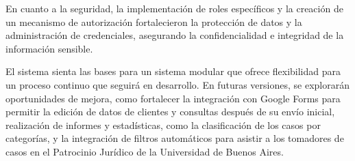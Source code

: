 En cuanto a la seguridad, la implementación de roles específicos y la creación de un mecanismo de autorización fortalecieron la protección de datos y la administración de credenciales, asegurando la confidencialidad e integridad de la información sensible.

El sistema sienta las bases para un sistema modular que ofrece flexibilidad para un proceso continuo que seguirá en desarrollo. En futuras versiones, se explorarán oportunidades de mejora, como fortalecer la integración con Google Forms para permitir la edición de datos de clientes y consultas después de su envío inicial, realización de informes y estadísticas, como la clasificación de los casos por categorías, y la integración de filtros automáticos para asistir a los tomadores de casos en el Patrocinio Jurídico de la Universidad de Buenos Aires.